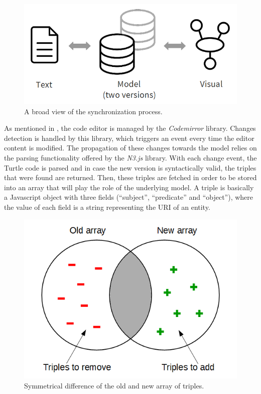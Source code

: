 \begin{figure}[!htbp]
	\centering
  	\centerline{\includegraphics[width=.7\linewidth]{img/sync_process.png}}
	\caption{A broad view of the synchronization process.}
	\label{img:sync_process}
\end{figure}

As mentioned in , the code editor is managed by the \textit{Codemirror} library. Changes detection is handled by this library, which triggers an event every time the editor content is modified. The propagation of these changes towards the model relies on the parsing functionality offered by the \textit{N3.js} library. With each change event, the Turtle code is parsed and in case the new version is syntactically valid, the triples that were found are returned. Then, these triples are fetched in order to be stored into an array that will play the role of the underlying model. A triple is basically a Javascript object with three fields (``subject'', ``predicate'' and ``object''), where the value of each field is a string representing the URI of an entity.

\begin{figure}[!htbp]
	\centering
  	\centerline{\includegraphics[width=.62\linewidth]{img/array_diff.png}}
	\caption{Symmetrical difference of the old and new array of triples.}
	\label{img:array_diff}
\end{figure}

